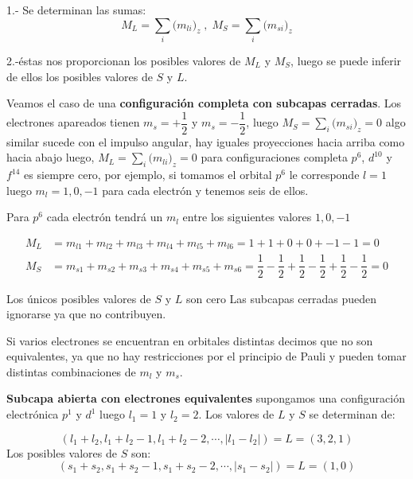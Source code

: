 1.- Se determinan las sumas:
\begin{equation}
M_{L}=\sum_{i}\big( m_{li}\big)_{z} \;,\; M_{S}=\sum_{i}\big( m_{si}\big)_{z} 
\end{equation}

2.-éstas nos proporcionan los posibles valores de $M_{L}$ y $M_{S}$, luego se puede inferir de ellos los posibles valores de $S$ y $L$.

Veamos el caso de una \textbf{configuración completa con subcapas cerradas}. Los electrones apareados tienen $m_{s}=+\dfrac{1}{2}$ y $m_{s}=-\dfrac{1}{2}$, luego $M_{S}=\sum_{i}\big( m_{si}\big)_{z}=0$ algo similar sucede con el impulso angular, hay iguales proyecciones hacia arriba como hacia abajo luego, $M_{L}=\sum_{i}\big( m_{li}\big)_{z}=0$ para configuraciones completa $p^{6}$, $d^{10}$ y $f^{14}$ es siempre cero, por ejemplo, si tomamos el orbital $p^{6}$ le corresponde $l=1$ luego $m_{l}=1,0,-1$ para cada electrón y tenemos seis de ellos.

Para $p^{6}$ cada electrón tendrá un $m_{l}$ entre los siguientes valores $1,0,−1$

\begin{equation*}
\begin{aligned}
	M_{L} &= m_{l1}+m_{l2}+m_{l3}+m_{l4}+m_{l5}+m_{l6}=1+1+0+0+-1-1=0\\
	M_{S} &= m_{s1}+m_{s2}+m_{s3}+m_{s4}+m_{s5}+m_{s6}=\dfrac{1}{2}-\dfrac{1}{2}+\dfrac{1}{2}-\dfrac{1}{2}+\dfrac{1}{2}-\dfrac{1}{2}=0
\end{aligned}
\end{equation*}

Los únicos posibles valores de $S$ y $L$ son cero Las subcapas cerradas pueden ignorarse ya que no contribuyen.

Si varios electrones se encuentran en orbitales distintas decimos que no son equivalentes, ya que no hay restricciones por el principio de Pauli y pueden tomar distintas combinaciones de $m_{l}$ y $m_{s}$.

\textbf{Subcapa abierta con electrones equivalentes} supongamos una configuración electrónica $p^{1}$ y $d^{1}$ luego $l_{1}=1$ y $l_{2}=2$. Los valores de $L$ y $S$ se determinan de:

\begin{equation*}
	(l_{1}+l_{2}, l_{1}+l_{2}-1, l_{1}+l_{2}-2, \cdots, |l_{1}-l_{2}|)= L= (3, 2, 1)
\end{equation*}
Los
posibles valores de $S$ son:
\begin{equation*}
	(s_{1}+s_{2}, s_{1}+s_{2}-1, s_{1}+s_{2}-2, \cdots, |s_{1}-s_{2}|)= L= (1, 0)
\end{equation*}

